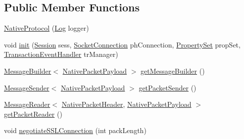 \subsection*{Public Member Functions}
\begin{DoxyCompactItemize}
\item 
\mbox{\hyperlink{classcom_1_1mysql_1_1cj_1_1protocol_1_1a_1_1_native_protocol_ae0847faf5ec07f6c29d29f3f26728b90}{Native\+Protocol}} (\mbox{\hyperlink{interfacecom_1_1mysql_1_1cj_1_1log_1_1_log}{Log}} logger)
\item 
void \mbox{\hyperlink{classcom_1_1mysql_1_1cj_1_1protocol_1_1a_1_1_native_protocol_a78d72401af5414a2271b9f1012b8a2f9}{init}} (\mbox{\hyperlink{interfacecom_1_1mysql_1_1cj_1_1_session}{Session}} sess, \mbox{\hyperlink{interfacecom_1_1mysql_1_1cj_1_1protocol_1_1_socket_connection}{Socket\+Connection}} ph\+Connection, \mbox{\hyperlink{interfacecom_1_1mysql_1_1cj_1_1conf_1_1_property_set}{Property\+Set}} prop\+Set, \mbox{\hyperlink{interfacecom_1_1mysql_1_1cj_1_1_transaction_event_handler}{Transaction\+Event\+Handler}} tr\+Manager)
\item 
\mbox{\hyperlink{interfacecom_1_1mysql_1_1cj_1_1_message_builder}{Message\+Builder}}$<$ \mbox{\hyperlink{classcom_1_1mysql_1_1cj_1_1protocol_1_1a_1_1_native_packet_payload}{Native\+Packet\+Payload}} $>$ \mbox{\hyperlink{classcom_1_1mysql_1_1cj_1_1protocol_1_1a_1_1_native_protocol_abded3c4e676d3558746c88ee5d206dda}{get\+Message\+Builder}} ()
\item 
\mbox{\hyperlink{interfacecom_1_1mysql_1_1cj_1_1protocol_1_1_message_sender}{Message\+Sender}}$<$ \mbox{\hyperlink{classcom_1_1mysql_1_1cj_1_1protocol_1_1a_1_1_native_packet_payload}{Native\+Packet\+Payload}} $>$ \mbox{\hyperlink{classcom_1_1mysql_1_1cj_1_1protocol_1_1a_1_1_native_protocol_aa2f4f22a35bd59ec16ca4cbf87e3fa6e}{get\+Packet\+Sender}} ()
\item 
\mbox{\hyperlink{interfacecom_1_1mysql_1_1cj_1_1protocol_1_1_message_reader}{Message\+Reader}}$<$ \mbox{\hyperlink{classcom_1_1mysql_1_1cj_1_1protocol_1_1a_1_1_native_packet_header}{Native\+Packet\+Header}}, \mbox{\hyperlink{classcom_1_1mysql_1_1cj_1_1protocol_1_1a_1_1_native_packet_payload}{Native\+Packet\+Payload}} $>$ \mbox{\hyperlink{classcom_1_1mysql_1_1cj_1_1protocol_1_1a_1_1_native_protocol_a04e273fff078fd0290c76ad9fd78744e}{get\+Packet\+Reader}} ()
\item 
void \mbox{\hyperlink{classcom_1_1mysql_1_1cj_1_1protocol_1_1a_1_1_native_protocol_a176849031728bdd55f4904b7a38ffa99}{negotiate\+S\+S\+L\+Connection}} (int pack\+Length)

\end{DoxyCompactItemize}
